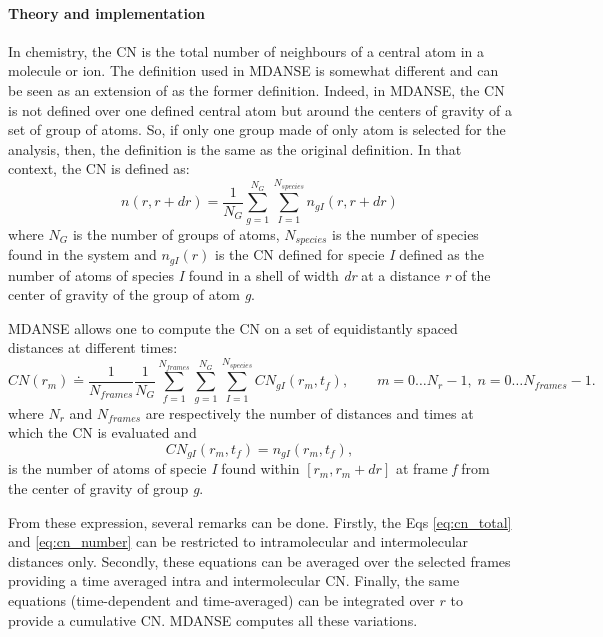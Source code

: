 \documentclass[a4paper,11pt]{article}
\begin{document}
\paragraph{Theory and implementation\\}
\label{cn_theory}
In chemistry, the \gls{CN} is the total number of neighbours of a central atom in a molecule or ion. The definition used in \gls{MDANSE} is somewhat
different and can be seen as an extension of as the former definition. Indeed, in \gls{MDANSE}, the \gls{CN} is not defined over one defined central atom but around
the centers of gravity of a set of group of atoms. So, if only one group made of only atom is selected for the analysis, then, the
definition is the same as the original definition. In that context, the \gls{CN} is defined as:
\begin{equation}
n(r, r+dr) = \frac{1}{N_{G}}\sum\limits_{g=1}^{N_{G}}\sum\limits_{I=1}^{N_{species}} n_{gI}(r, r+dr)
\end{equation}
where $N_{G}$ is the number of groups of atoms, $N_{species}$ is the number of species found in the system and
$n_{gI}(r)$ is the \gls{CN} defined for specie \textit{I} defined as the number of atoms of species \textit{I} found
in a shell of width \textit{dr} at a distance \textit{r} of the center of gravity of the group of atom \textit{g}.

\gls{MDANSE} allows one to compute the \gls{CN} on a set of equidistantly spaced distances at different times:
\begin{equation}
\label{eq:cn_total}
CN(r_m) \doteq \frac{1}{N_{frames}}\frac{1}{N_{G}}\sum\limits_{f=1}^{N_{frames}}\sum\limits_{g=1}^{N_{G}}\sum\limits_{I=1}^{N_{species}} CN_{gI}(r_m, t_f),
\qquad m = 0\ldots N_r - 1,\; n = 0\ldots N_{frames} - 1.
\end{equation}
where $N_r$ and $N_{frames}$ are respectively the number of distances and times at which the \gls{CN} is evaluated and
\begin{equation}
\label{eq:cn_number}
CN_{gI}(r_m, t_f) = n_{gI}(r_m, t_f),
\end{equation}
is the number of atoms of specie \textit{I} found within $[r_m,r_m + dr]$ at frame \textit{f} from the center of gravity of group \textit{g}.

From these expression, several remarks can be done. Firstly, the Eqs \ref{eq:cn_total} and \ref{eq:cn_number} can be restricted
to intramolecular and intermolecular distances only. Secondly, these equations can be averaged over the selected frames providing a time averaged intra and intermolecular
\gls{CN}. Finally, the same equations (time-dependent and time-averaged) can be integrated over $r$ to provide a
cumulative \gls{CN}. \gls{MDANSE} computes all these variations.
\end{document}
